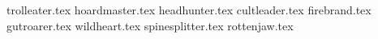 
\bignamesintro{}

\raggedcolumns
\begin{multicols}{2}

	\startsortedpricelistNSP
	
	{trolleater.tex}
	{hoardmaster.tex}
	{headhunter.tex}
	{cultleader.tex}
	{firebrand.tex}
	{gutroarer.tex}
	{wildheart.tex}
	{spinesplitter.tex}
	{rottenjaw.tex}
	
	\endsortedpricelistNSP

\end{multicols}


